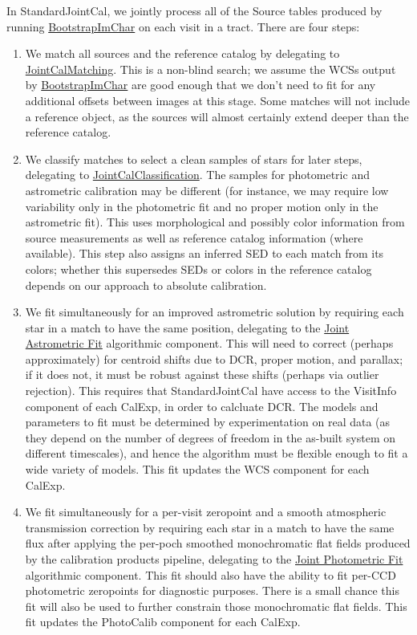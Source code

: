 In StandardJointCal, we jointly process all of the Source tables produced by running \hyperref[sec:drpBootstrapImChar]{BootstrapImChar} on each visit in a tract.  There are four steps:
\begin{enumerate}
\item We match all sources and the reference catalog by delegating to \hyperref[sec:acJointCalMatching]{JointCalMatching}.  This is a non-blind search; we assume the WCSs output by \hyperref[sec:drpBootstrapImChar]{BootstrapImChar} are good enough that we don't need to fit for any additional offsets between images at this stage.  Some matches will not include a reference object, as the sources will almost certainly extend deeper than the reference catalog.
\item We classify matches to select a clean samples of stars for later steps, delegating to \hyperref[sec:acJointCalClassification]{JointCalClassification}.  The samples for photometric and astrometric calibration may be different (for instance, we may require low variability only in the photometric fit and no proper motion only in the astrometric fit).  This uses morphological and possibly color information from source measurements as well as reference catalog information (where available).  This step also assigns an inferred SED to each match from its colors; whether this supersedes SEDs or colors in the reference catalog depends on our approach to absolute calibration.
\item We fit simultaneously for an improved astrometric solution by requiring each star in a match to have the same position, delegating to the \hyperref[sec:acJointAstrometricFit]{Joint Astrometric Fit} algorithmic component.  This will need to correct (perhaps approximately) for centroid shifts due to DCR, proper motion, and parallax; if it does not, it must be robust against these shifts (perhaps via outlier rejection).  This requires that StandardJointCal have access to the VisitInfo component of each CalExp, in order to calcluate DCR.  The models and parameters to fit must be determined by experimentation on real data (as they depend on the number of degrees of freedom in the as-built system on different timescales), and hence the algorithm must be flexible enough to fit a wide variety of models.  This fit updates the WCS component for each CalExp.
\item We fit simultaneously for a per-visit zeropoint and a smooth atmospheric transmission correction by requiring each star in a match to have the same flux after applying the per-poch smoothed monochromatic flat fields produced by the calibration products pipeline, delegating to the \hyperref[sec:acJointPhotometricFit]{Joint Photometric Fit} algorithmic component.  This fit should also have the ability to fit per-CCD photometric zeropoints for diagnostic purposes.  There is a small chance this fit will also be used to further constrain those monochromatic flat fields.  This fit updates the PhotoCalib component for each CalExp.
\end{enumerate}

